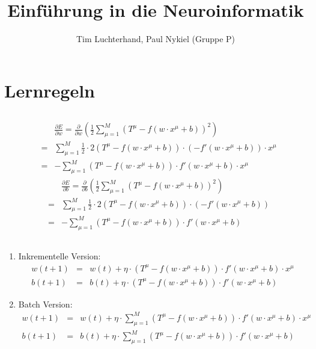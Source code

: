 \documentclass[DIN, pagenumber=false, fontsize=11pt, parskip=half]{scrartcl}
\title{Einführung in die Neuroinformatik}
\author{Tim Luchterhand, Paul Nykiel (Gruppe P)}
\begin{document}
    \maketitle
    \section{Lernregeln}
    \subsection{}
    \begin{eqnarray*}
        && \frac{\partial E}{\partial w} = \frac{\partial}{\partial w}\left( \frac{1}{2} \sum_{\mu=1}^M {(T^\mu - f(w \cdot x^\mu +b))}^2 \right) \\
        &=& \sum_{\mu=1}^M \frac{1}{2} \cdot 2 (T^\mu - f(w \cdot x^\mu + b)) \cdot (-f'(w \cdot x^\mu + b)) \cdot x^\mu \\
        &=& - \sum_{\mu=1}^M (T^\mu - f(w \cdot x^\mu + b)) \cdot f'(w \cdot x^\mu + b) \cdot x^\mu
    \end{eqnarray*}
    \begin{eqnarray*}
        && \frac{\partial E}{\partial b} = \frac{\partial}{\partial b}\left( \frac{1}{2} \sum_{\mu=1}^M {(T^\mu - f(w \cdot x^\mu +b))}^2 \right) \\
        &=& \sum_{\mu=1}^M \frac{1}{2} \cdot 2 (T^\mu - f(w \cdot x^\mu + b)) \cdot (-f'(w \cdot x^\mu + b))\\
        &=& - \sum_{\mu=1}^M (T^\mu - f(w \cdot x^\mu + b)) \cdot f'(w \cdot x^\mu + b)
    \end{eqnarray*}
    \subsection{}
    \begin{enumerate}[label=(\alph*)]
        \item Inkrementelle Version:
            \begin{eqnarray*}
                w(t+1) &=& w(t) + \eta \cdot (T^\mu - f(w \cdot x^\mu + b)) \cdot f'(w \cdot x^\mu + b) \cdot x^\mu \\
                b(t+1) &=& b(t) + \eta \cdot  (T^\mu - f(w \cdot x^\mu + b)) \cdot f'(w \cdot x^\mu + b) 
            \end{eqnarray*}
        \item Batch Version:
            \begin{eqnarray*}
                w(t+1) &=& w(t) + \eta \cdot \sum_{\mu=1}^M (T^\mu - f(w \cdot x^\mu + b)) \cdot f'(w \cdot x^\mu + b) \cdot x^\mu \\
                b(t+1) &=& b(t) + \eta \cdot \sum_{\mu=1}^M (T^\mu - f(w \cdot x^\mu + b)) \cdot f'(w \cdot x^\mu + b) 
            \end{eqnarray*}
    \end{enumerate}
\end{document}
